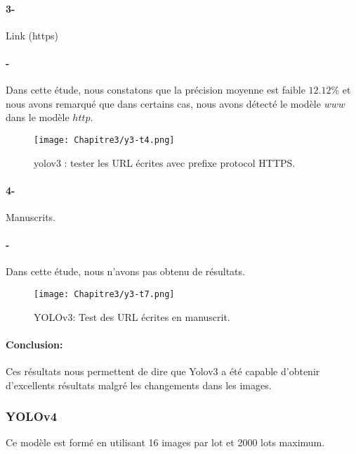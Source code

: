            \paragraph{3-}Link (https)
           \paragraph{-} Dans cette étude, nous constatons que  la précision moyenne  est faible $12.12\%$ et nous avons remarqué que dans certains cas, nous avons détecté le modèle $www$ dans le modèle $http$.
           
           \begin{figure}[H]
               \centering
                \texttt{[image: Chapitre3/y3-t4.png]}
                \caption{yolov3 : tester les URL écrites avec prefixe protocol HTTPS.}
                \label{y3_t4}
                \end{figure}


           \paragraph{4-} Manuscrits.
           \paragraph{-} Dans cette étude, nous n'avons pas obtenu de résultats.

           \begin{figure}[H]
               \centering
                \texttt{[image: Chapitre3/y3-t7.png]}
                \caption{YOLOv3: Test des URL écrites en manuscrit.}
                \label{y3_t7}
                \end{figure}

           \paragraph{Conclusion:} Ces résultats nous permettent de dire que Yolov3 a été capable d'obtenir d'excellents résultats malgré les changements dans les images.  
           
           
                

          \subsubsection{YOLOv4}
          Ce modèle est formé en utilisant 16 images par lot et 2000 lots maximum.

